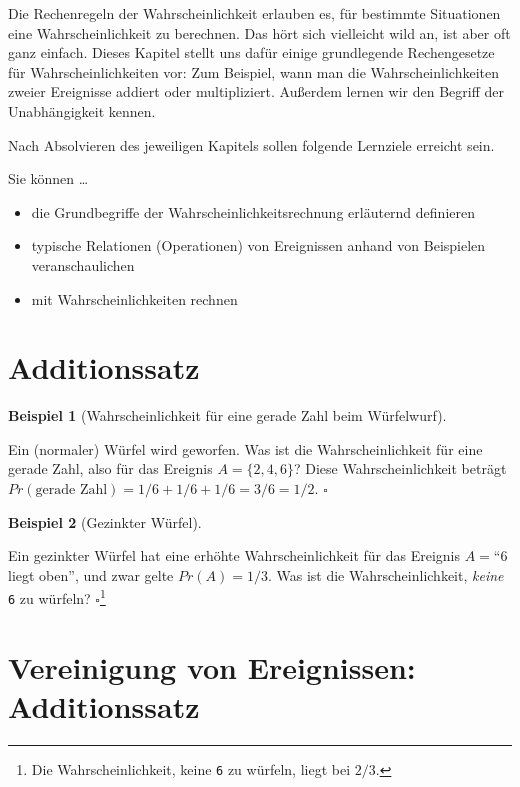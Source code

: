 \documentclass[
  ngerman,
  letterpaper,
  twoside,
  open=any]{scrbook}
\providecommand{\tightlist}{%
  \setlength{\itemsep}{0pt}\setlength{\parskip}{0pt}}\usepackage{longtable,booktabs,array}
\theoremstyle{definition}
\newtheorem{example}{Beispiel}[chapter]
\theoremstyle{plain}
\theoremstyle{definition}
\theoremstyle{definition}
\theoremstyle{remark}
\begin{document}
Die Rechenregeln der Wahrscheinlichkeit erlauben es, für bestimmte
Situationen eine Wahrscheinlichkeit zu berechnen. Das hört sich
vielleicht wild an, ist aber oft ganz einfach. Dieses Kapitel stellt uns
dafür einige grundlegende Rechengesetze für Wahrscheinlichkeiten vor:
Zum Beispiel, wann man die Wahrscheinlichkeiten zweier Ereignisse
addiert oder multipliziert. Außerdem lernen wir den Begriff der
Unabhängigkeit kennen.

Nach Absolvieren des jeweiligen Kapitels sollen folgende Lernziele
erreicht sein.

Sie können \ldots{}

\begin{itemize}
\tightlist
\item
  die Grundbegriffe der Wahrscheinlichkeitsrechnung erläuternd
  definieren
\item
  typische Relationen (Operationen) von Ereignissen anhand von
  Beispielen veranschaulichen
\item
  mit Wahrscheinlichkeiten rechnen
\end{itemize}

\section{Additionssatz}\label{additionssatz}

\begin{example}[Wahrscheinlichkeit für eine gerade Zahl beim
Würfelwurf]\protect\hypertarget{exm-add-ereignisse}{}\label{exm-add-ereignisse}

Ein (normaler) Würfel wird geworfen. Was ist die Wahrscheinlichkeit für
eine gerade Zahl, also für das Ereignis \(A=\{2, 4, 6\}\)? Diese
Wahrscheinlichkeit beträgt
\(Pr(\text{gerade Zahl}) = 1/6 + 1/6 + 1/6 = 3/6 = 1/2\). \(\square\)

\end{example}

\begin{example}[Gezinkter
Würfel]\protect\hypertarget{exm-ind2}{}\label{exm-ind2}

Ein gezinkter Würfel hat eine erhöhte Wahrscheinlichkeit für das
Ereignis \(A=\)\enquote{6 liegt oben}, und zwar gelte \(Pr(A)=1/3\). Was
ist die Wahrscheinlichkeit, \emph{keine} \texttt{6} zu würfeln?
\(\square\)\footnote{Die Wahrscheinlichkeit, keine \texttt{6} zu
  würfeln, liegt bei \(2/3\).}

\end{example}

\section{Vereinigung von Ereignissen:
Additionssatz}\label{vereinigung-von-ereignissen-additionssatz}
\end{document}
